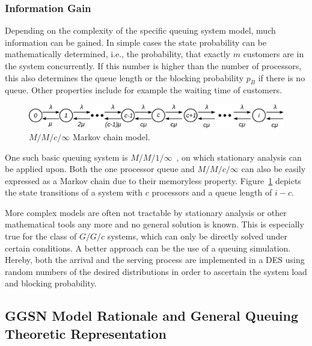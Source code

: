 \subsubsection{Information Gain}

Depending on the complexity of the specific queuing system model, much information can be gained. In simple cases the state probability can be mathematically determined, i.e., the probability, that exactly $m$ customers are in the system concurrently. If this number is higher than the number of processors, this also determines the queue length or the blocking probability $p_B$ if there is no queue. Other properties include for example the waiting time of customers.

\begin{figure}[htb]
	\centering
	\includegraphics[width=\textwidth]{images/markovchain.pdf}
	\caption{$M/M/c/\infty$ Markov chain model.}
\label{c4:fig:markovchain}
\end{figure}


One such basic queuing system is $M/M/1/\infty$~\cite[pp.~94-99]{Kleinrock:1975:TVQ:1096491}, on which stationary analysis can be applied upon. Both the one processor queue and $M/M/c/\infty$ can also be easily expressed as a Markov chain due to their memoryless property. Figure~\ref{c4:fig:markovchain} depicts the state transitions of a system with $c$ processors and a queue length of $i-c$.

More complex models are often not tractable by stationary analysis or other mathematical tools any more and no general solution is known. This is especially true for the class of $G/G/c$ systems, which can only be directly solved under certain conditions. A better approach can be the use of a queuing simulation. Hereby, both the arrival and the serving process are implemented in a \gls{DES} using random numbers of the desired distributions in order to ascertain the system load and blocking probability.


\subsection{GGSN Model Rationale and General Queuing Theoretic Representation}

